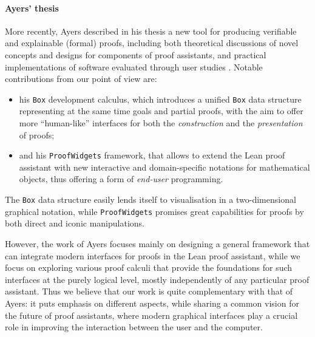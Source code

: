 \paragraph{Ayers' thesis}

More recently, Ayers described in his thesis a new tool for producing verifiable
and explainable (formal) proofs, including both theoretical discussions of novel
concepts and designs for components of proof assistants, and practical
implementations of software evaluated through user studies
. Notable contributions from our point of view are:
\begin{itemize}
  \item his \texttt{Box} development calculus, which introduces a unified
\texttt{Box} data structure representing at the same time goals and partial
proofs, with the aim to offer more ``human-like'' interfaces for both the
\emph{construction} and the \emph{presentation} of proofs;
  \item and his \texttt{ProofWidgets} framework, that allows to extend the Lean
proof assistant with new interactive and domain-specific notations for
mathematical objects, thus offering a form of \emph{end-user} programming.
\end{itemize}
The \texttt{Box} data structure easily lends itself to visualisation in a
two-dimensional graphical notation, while \texttt{ProofWidgets} promises great
capabilities for proofs by both direct and iconic manipulations.

However, the work of Ayers focuses mainly on designing a general framework that
can integrate modern interfaces for proofs in the Lean proof assistant, while we
focus on exploring various proof calculi that provide the foundations for such
interfaces at the purely logical level, mostly independently of any particular
proof assistant. Thus we believe that our work is quite complementary with that
of Ayers: it puts emphasis on different aspects, while sharing a common vision
for the future of proof assistants, where modern graphical interfaces play a
crucial role in improving the interaction between the user and the computer.